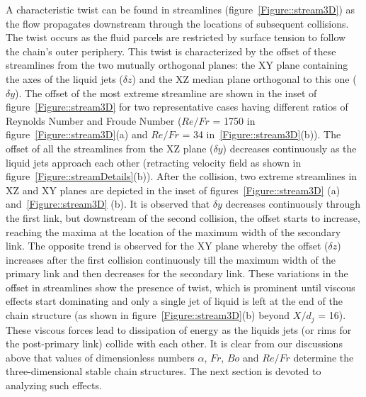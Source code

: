 \documentclass[%
 aip,
 sd,%
amsmath,amssymb,
preprint,%
author-year,%
]{revtex4-1}
\begin{document}
A characteristic twist can be found in streamlines (figure~\ref{Figure::stream3D}) as the flow propagates downstream through the locations of subsequent collisions. The twist occurs as the fluid parcels are restricted by surface tension to follow the chain's outer periphery. This twist is characterized by the offset of these streamlines from the two mutually orthogonal planes: the XY plane containing the axes of the liquid jets ($\delta z$) and the XZ median plane orthogonal to this one ($\delta y$). The offset of the most extreme streamline are shown in the inset of figure~\ref{Figure::stream3D} for two representative cases having different ratios of Reynolds Number and Froude Number ($Re/Fr$ = 1750 in figure~\ref{Figure::stream3D}(a) and $Re/Fr$ = 34 in~\ref{Figure::stream3D}(b)). The offset of all the streamlines from the XZ plane ($\delta y$) decreases continuously as the liquid jets approach each other (retracting velocity field as shown in figure~\ref{Figure::streamDetails}(b)). After the collision, two extreme streamlines in XZ and XY planes are depicted in the inset of figures~\ref{Figure::stream3D} (a) and~\ref{Figure::stream3D} (b). It is observed that $\delta y$ decreases continuously through the first link, but downstream of the second collision, the offset starts to increase, reaching the maxima at the location of the maximum width of the secondary link. The opposite trend is observed for the XY plane whereby the offset ($\delta z$) increases after the first collision continuously till the maximum width of the primary link and then decreases for the secondary link. These variations in the offset in streamlines show the presence of twist, which is prominent until viscous effects start dominating and only a single jet of liquid is left at the end of the chain structure (as shown in figure~\ref{Figure::stream3D}(b) beyond $X/d_j$ = 16). These viscous forces lead to dissipation of energy as the liquids jets (or rims for the post-primary link) collide with each other. It is clear from our discussions above that values of dimensionless numbers $\alpha$, $Fr$, $Bo$ and $Re/Fr$ determine the three-dimensional stable chain structures. The next section is devoted to analyzing such effects.
\end{document}
